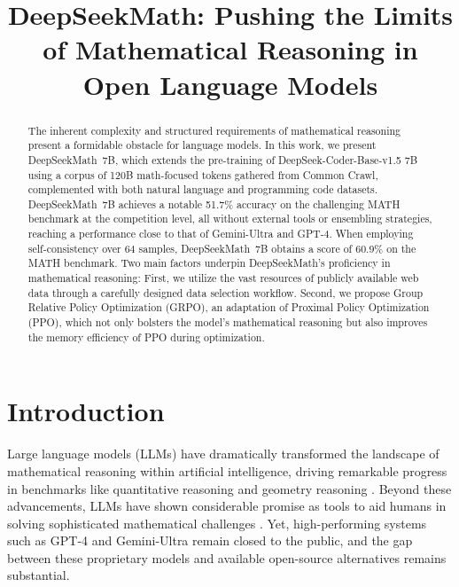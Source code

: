 \title{DeepSeekMath: Pushing the Limits of Mathematical Reasoning in Open Language Models}

\begin{abstract}
The inherent complexity and structured requirements of mathematical reasoning present a formidable obstacle for language models. In this work, we present DeepSeekMath~7B, which extends the pre-training of DeepSeek-Coder-Base-v1.5 7B using a corpus of 120B math-focused tokens gathered from Common Crawl, complemented with both natural language and programming code datasets. DeepSeekMath~7B achieves a notable 51.7\% accuracy on the challenging MATH benchmark at the competition level, all without external tools or ensembling strategies, reaching a performance close to that of Gemini-Ultra and GPT-4. When employing self-consistency over 64 samples, DeepSeekMath~7B obtains a score of 60.9\% on the MATH benchmark. Two main factors underpin DeepSeekMath's proficiency in mathematical reasoning: First, we utilize the vast resources of publicly available web data through a carefully designed data selection workflow. Second, we propose Group Relative Policy Optimization (GRPO), an adaptation of Proximal Policy Optimization (PPO), which not only bolsters the model's mathematical reasoning but also improves the memory efficiency of PPO during optimization.
\end{abstract}

\section{Introduction}

Large language models (LLMs) have dramatically transformed the landscape of mathematical reasoning within artificial intelligence, driving remarkable progress in benchmarks like quantitative reasoning \citep{MATH} and geometry reasoning \citep{trinh2024solving}. Beyond these advancements, LLMs have shown considerable promise as tools to aid humans in solving sophisticated mathematical challenges \citep{tao}. Yet, high-performing systems such as GPT-4 \citep{gpt4} and Gemini-Ultra \citep{gemini} remain closed to the public, and the gap between these proprietary models and available open-source alternatives remains substantial.

